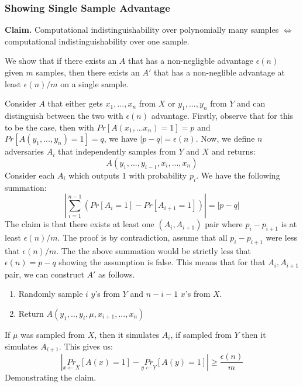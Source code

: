 \documentclass[11pt]{article}
\begin{document}
\subsubsection{Showing Single Sample Advantage}
\textbf{Claim.} Computational indistinguishability over polynomially many samples $\Longleftrightarrow$ computational indistinguishability over one sample.
\vspace{1em}

We show that if there exists an $A$ that has a non-negligble advantage $\epsilon(n)$ given $m$ samples, then there exists an $A'$ that has a non-neglible advantage at least $\epsilon(n)/m$ on a single sample.
\vspace{1em}

Consider $A$ that either gets $x_1,...,x_n$ from $X$ or $y_1,...,y_n$ from $Y$ and can distinguish between the two with $\epsilon(n)$ advantage. Firstly, observe that for this to be the case, then with $Pr[A(x_1,...x_n) = 1] = p$ and $Pr[A(y_1,...,y_n)=1]=q$, we have $|p-q| = \epsilon(n)$. Now, we define $n$ adversaries $A_i$ that independently samples from $Y$ and $X$ and returns:
$$A(y_1,...,y_{i-1},x_{i},...,x_n)$$
Consider each $A_i$ which outputs $1$ with probability $p_i$. We have the following summation:
$$|\sum_{i=1}^{n-1} (Pr[A_i=1]-Pr[A_{i+1}=1])| = |p-q|$$
The claim is that there exists at least one $(A_i,A_{i+1})$ pair where $p_i - p_{i+1}$ is at least $\epsilon(n)/m$. The proof is by contradiction, assume that all $p_i - p_{i+1}$ were less that $\epsilon(n)/m$. The the above summation would be strictly less that $\epsilon(n) = p-q$ showing the assumption is false. This means that for that $A_i, A_{i+1}$ pair, we can construct $A'$ as follows.
\begin{enumerate}
    \item Randomly sample $i$ $y$'s from $Y$ and $n-i-1$ $x$'s from $X$.
    \item Return $A(y_1,..,y_{i},\mu,x_{i+1},...,x_n)$
\end{enumerate}
If $\mu$ was sampled from $X$, then it simulates $A_{i}$, if sampled from $Y$ then it simulates $A_{i+1}$. This gives us:
$$|\underset{x \leftarrow X}{Pr}[A(x)=1] - \underset{y\leftarrow Y}{Pr}[A(y)=1]| \geq \frac{\epsilon(n)}{m}$$
Demonstrating the claim.
\end{document}
